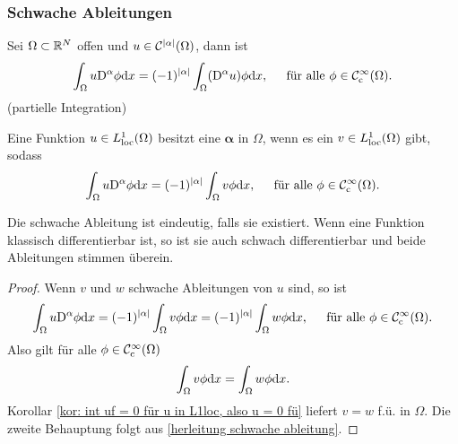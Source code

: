 \subsubsection*{Schwache Ableitungen}
Sei \(\Omega\subset\mathbb{R}^N\) offen und \(u\in\mathcal{C}^{|\alpha|}(\Omega)\), dann ist
\begin{equation}
	\label{herleitung schwache ableitung}
	\int_\Omega u\mathrm{D}^\alpha\phi\mathrm{d}x=(-1)^{|\alpha|}\int_\Omega(\mathrm{D}^\alpha u)\phi\mathrm{d}x,\;\;\;\;\text{ für alle }\phi\in\mathcal{C}_{\mathrm{c}}^\infty(\Omega).
\end{equation}
(partielle Integration)
\begin{definition}\label{def: schwache ableitung}
	Eine Funktion \(u\in L_{\mathrm{loc}}^1(\Omega)\) besitzt eine \(\bm{\alpha}\) in \(\Omega\), wenn es ein \(v\in L_{\mathrm{loc}}^1(\Omega)\) gibt, sodass
	\begin{equation*}
		\int_\Omega u\mathrm{D}^\alpha\phi\mathrm{d}x=(-1)^{|\alpha|}\int_\Omega v\phi\mathrm{d}x,\;\;\;\;\text{ für alle }\phi\in\mathcal{C}_{\mathrm{c}}^\infty(\Omega).
	\end{equation*}
\end{definition}
\begin{lem}\label{lem: eindeutigkeit der schwachen ableitung}
	Die schwache Ableitung ist eindeutig, falls sie existiert. Wenn eine Funktion klassisch differentierbar ist, so ist sie auch schwach differentierbar und beide Ableitungen stimmen überein.
\end{lem}
\begin{proof}
	Wenn \(v\) und \(w\) schwache Ableitungen von \(u\) sind, so ist
	\begin{equation*}
		\int_\Omega u\mathrm{D}^\alpha\phi\mathrm{d}x=(-1)^{|\alpha|}\int_\Omega v\phi\mathrm{d}x=(-1)^{|\alpha|}\int_\Omega w\phi\mathrm{d}x,\;\;\;\;\text{ für alle }\phi\in\mathcal{C}_{\mathrm{c}}^\infty(\Omega).
	\end{equation*}
	Also gilt für alle \(\phi\in\mathcal{C}_{\mathrm{c}}^\infty(\Omega)\)
	\begin{equation*}
		\int_\Omega v\phi\mathrm{d}x=\int_\Omega w\phi\mathrm{d}x.
	\end{equation*}
	Korollar \ref{kor: int uf = 0 für u in L1loc, also u = 0 fü} liefert \(v=w\) f.ü. in \(\Omega\). Die zweite Behauptung folgt aus \eqref{herleitung schwache ableitung}.
\end{proof}

